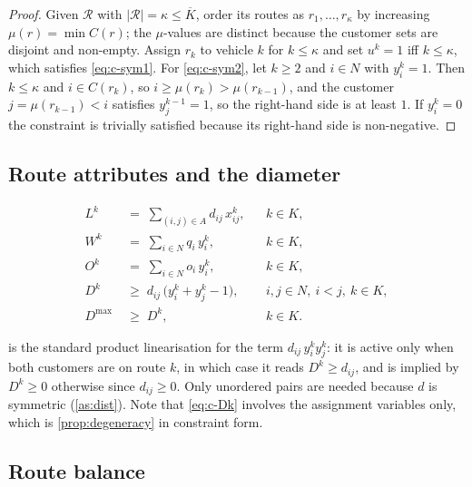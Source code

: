 \documentclass[11pt,a4paper]{article}
\theoremstyle{definition}
\theoremstyle{plain}
\newcommand{\Routes}{\mathcal{R}}
\newcommand{\Arcs}{A}
\newcommand{\Cust}{N}
\newcommand{\Veh}{K}
\newcommand{\Dmax}{D^{\max}}
\begin{document}
\begin{proof}
Given $\Routes$ with $|\Routes| = \kappa \le \overline{K}$, order its routes as
$r_1,\dots,r_\kappa$ by increasing $\mu(r) = \min C(r)$; the $\mu$-values are
distinct because the customer sets are disjoint and non-empty.  Assign $r_k$ to
vehicle $k$ for $k \le \kappa$ and set $u^k = 1$ iff $k \le \kappa$, which
satisfies \eqref{eq:c-sym1}.  For \eqref{eq:c-sym2}, let $k \ge 2$ and
$i \in \Cust$ with $y^k_i = 1$.  Then $k \le \kappa$ and
$i \in C(r_k)$, so $i \ge \mu(r_k) > \mu(r_{k-1})$, and the customer
$j = \mu(r_{k-1}) < i$ satisfies $y^{k-1}_j = 1$, so the right-hand side is at
least $1$.  If $y^k_i = 0$ the constraint is trivially satisfied because its
right-hand side is non-negative.
\end{proof}

\subsection{Route attributes and the diameter}
\label{sec:milp-attributes}

\begin{align}
  L^k &\;=\; \sum_{(i,j) \in \Arcs} d_{ij}\, x^k_{ij},
  & &k \in \Veh, \label{eq:c-Lk}\\
  W^k &\;=\; \sum_{i \in \Cust} q_i\, y^k_i,
  & &k \in \Veh, \label{eq:c-Wk}\\
  O^k &\;=\; \sum_{i \in \Cust} o_i\, y^k_i,
  & &k \in \Veh, \label{eq:c-Ok}\\
  D^k &\;\ge\; d_{ij}\,\bigl( y^k_i + y^k_j - 1 \bigr),
  & &i,j \in \Cust,\ i < j,\ k \in \Veh, \label{eq:c-Dk}\\
  \Dmax &\;\ge\; D^k,
  & &k \in \Veh. \label{eq:c-Dmax}
\end{align}

 is the standard product linearisation for the term
$d_{ij}\, y^k_i y^k_j$: it is active only when both customers are on route $k$,
in which case it reads $D^k \ge d_{ij}$, and is implied by $D^k \ge 0$
otherwise since $d_{ij} \ge 0$.  Only unordered pairs are needed because $d$ is
symmetric (\cref{as:dist}).  Note that \eqref{eq:c-Dk} involves the assignment
variables only, which is \cref{prop:degeneracy} in constraint form.

\subsection{Route balance}
\label{sec:milp-balance}
\end{document}

